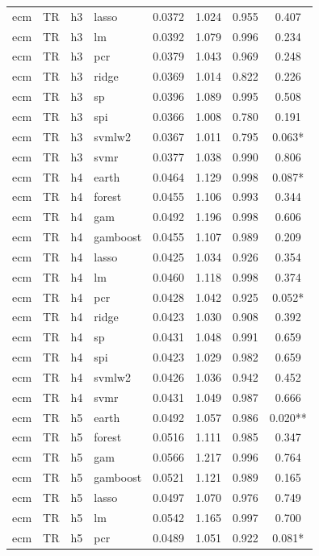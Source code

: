\begin{ThreePartTable}
\begin{longtable}[t]{llclcccc}
ecm & TR & h3 & lasso & 0.0372 & 1.024 & 0.955 & 0.407\\
ecm & TR & h3 & lm & 0.0392 & 1.079 & 0.996 & 0.234\\
ecm & TR & h3 & pcr & 0.0379 & 1.043 & 0.969 & 0.248\\
ecm & TR & h3 & ridge & 0.0369 & 1.014 & 0.822 & 0.226\\
ecm & TR & h3 & sp & 0.0396 & 1.089 & 0.995 & 0.508\\
ecm & TR & h3 & spi & 0.0366 & 1.008 & 0.780 & 0.191\\
ecm & TR & h3 & svmlw2 & 0.0367 & 1.011 & 0.795 & 0.063*\\
ecm & TR & h3 & svmr & 0.0377 & 1.038 & 0.990 & 0.806\\
\addlinespace
ecm & TR & h4 & earth & 0.0464 & 1.129 & 0.998 & 0.087*\\
ecm & TR & h4 & forest & 0.0455 & 1.106 & 0.993 & 0.344\\
ecm & TR & h4 & gam & 0.0492 & 1.196 & 0.998 & 0.606\\
ecm & TR & h4 & gamboost & 0.0455 & 1.107 & 0.989 & 0.209\\
ecm & TR & h4 & lasso & 0.0425 & 1.034 & 0.926 & 0.354\\
ecm & TR & h4 & lm & 0.0460 & 1.118 & 0.998 & 0.374\\
ecm & TR & h4 & pcr & 0.0428 & 1.042 & 0.925 & 0.052*\\
ecm & TR & h4 & ridge & 0.0423 & 1.030 & 0.908 & 0.392\\
ecm & TR & h4 & sp & 0.0431 & 1.048 & 0.991 & 0.659\\
ecm & TR & h4 & spi & 0.0423 & 1.029 & 0.982 & 0.659\\
ecm & TR & h4 & svmlw2 & 0.0426 & 1.036 & 0.942 & 0.452\\
ecm & TR & h4 & svmr & 0.0431 & 1.049 & 0.987 & 0.666\\
\addlinespace
ecm & TR & h5 & earth & 0.0492 & 1.057 & 0.986 & 0.020**\\
ecm & TR & h5 & forest & 0.0516 & 1.111 & 0.985 & 0.347\\
ecm & TR & h5 & gam & 0.0566 & 1.217 & 0.996 & 0.764\\
ecm & TR & h5 & gamboost & 0.0521 & 1.121 & 0.989 & 0.165\\
ecm & TR & h5 & lasso & 0.0497 & 1.070 & 0.976 & 0.749\\
ecm & TR & h5 & lm & 0.0542 & 1.165 & 0.997 & 0.700\\
ecm & TR & h5 & pcr & 0.0489 & 1.051 & 0.922 & 0.081*\\

\end{longtable}
\end{ThreePartTable}

